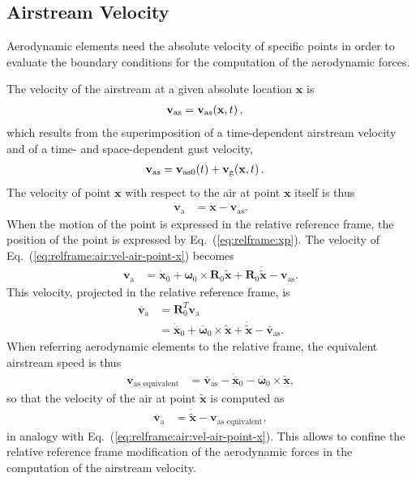 \documentclass[10pt,dvips,fleqn,subeqn]{report}
\newcommand{\T}[1]{\bm{\mathbf{#1}}}
\newcommand{\TT}[1]{\bm{\mathbf{#1}}}
\begin{document}
\subsection{Airstream Velocity}
\label{sec:nodes:structural nodes:airstream velocity}
Aerodynamic elements need the absolute velocity of specific points
in order to evaluate the boundary conditions for the computation
of the aerodynamic forces.

The velocity of the airstream at a given absolute location $\T{x}$ is
\begin{align}
	\T{v}_{\text{as}}
	&= \T{v}_{\text{as}}\!\plbr{\T{x}, t} ,
\end{align}
which results from the superimposition of a time-dependent airstream velocity
and of a time- and space-dependent gust velocity,
\begin{align}
	\T{v}_{\text{as}}
	&= \T{v}_{\text{as0}}\!\plbr{t}
	+ \T{v}_{\text{g}}\!\plbr{\T{x}, t} .
\end{align}
The velocity of point $\T{x}$ with respect to the air at point $\T{x}$
itself is thus
\begin{align}
	\T{v}_{\text{a}}
	&= \dot{\T{x}}
	- \T{v}_{\text{as}} .
	\label{eq:relframe:air:vel-air-point-x}
\end{align}
When the motion of the point is expressed in the relative reference frame,
the position of the point is expressed by Eq.~(\ref{eq:relframe:xp}).
The velocity of Eq.~(\ref{eq:relframe:air:vel-air-point-x}) becomes
\begin{align}
	\T{v}_{\text{a}}
	&= \dot{\T{x}}_0
	+ \T{\omega}_0 \times \TT{R}_0 \tilde{\T{x}}
	+ \TT{R}_0 \dot{\tilde{\T{x}}}
	- \T{v}_{\text{as}} .
\end{align}
This velocity, projected in the relative reference frame, is
\begin{align}
	\overline{\T{v}}_{\text{a}}
	&= \TT{R}_0^T \T{v}_{\text{a}} \nonumber \\
	&= \dot{\overline{\T{x}}}_0
	+ \overline{\T{\omega}}_0 \times \tilde{\T{x}}
	+ \dot{\tilde{\T{x}}}
	- \overline{\T{v}}_{\text{as}} .
\end{align}
When referring aerodynamic elements to the relative frame,
the equivalent airstream speed is thus
\begin{align}
	\T{v}_{\text{as equivalent}}
	&=
	\overline{\T{v}}_{\text{as}}
	- \dot{\overline{\T{x}}}_0
	- \overline{\T{\omega}}_0 \times \tilde{\T{x}} ,
\end{align}
so that the velocity of the air at point $\tilde{\T{x}}$ is computed as
\begin{align}
	\overline{\T{v}}_{\text{a}}
	&= \dot{\tilde{\T{x}}}
	- \T{v}_{\text{as equivalent}} ,
\end{align}
in analogy with Eq.~(\ref{eq:relframe:air:vel-air-point-x}).
This allows to confine the relative reference frame modification
of the aerodynamic forces in the computation of the airstream velocity.
\end{document}
